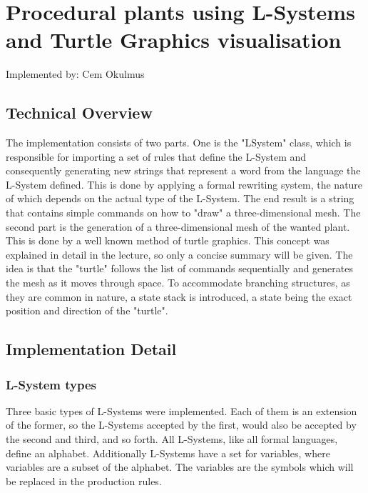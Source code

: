 \documentclass[11pt,a4paper]{article}
\begin{document}
\section{Procedural plants using L-Systems and Turtle Graphics \newline visualisation}
Implemented by: Cem Okulmus

\subsection{Technical Overview}
The implementation consists of two parts. One is the "LSystem" class, which is
responsible for importing a set of rules that define the L-System and
consequently generating new strings that represent a word from the language the
L-System defined. This is done by applying a formal rewriting system, the nature
of which depends on the actual type of the L-System. The end result is a string that contains simple commands on how to "draw" a three-dimensional mesh.
\newline
The second part is the generation of a three-dimensional mesh of the wanted plant. This is done by a well known method of turtle graphics. This concept was explained in detail in the lecture, so only a concise summary will be given. The idea is that the "turtle" follows the list of commands sequentially and generates the mesh as it moves through space. To accommodate branching structures, as they are common in nature, a state stack is introduced, a state being the exact position and direction of the "turtle".

\subsection{Implementation Detail}

\subsubsection{L-System types}
Three basic types of L-Systems were implemented. Each of them is an extension of the former, so the L-Systems accepted by the first, would also be accepted by the second and third, and so forth. All L-Systems, like all formal languages, define an alphabet. Additionally L-Systems have a set for variables, where variables are a subset of the alphabet. The variables are the symbols which will be replaced in the production rules.
\end{document}
